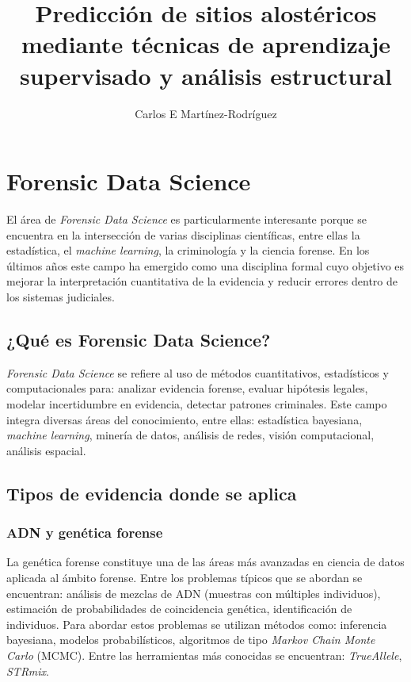 \documentclass[a4paper,10pt,oneside]{article}
\author{Carlos E Mart\'inez-Rodr\'iguez}
\date{}
\title{Predicci\'on de sitios alost\'ericos mediante t\'ecnicas de aprendizaje supervisado y an\'alisis estructural}
\begin{document}
\maketitle 
\tableofcontents
\section{Forensic Data Science}

El \'area de \textit{Forensic Data Science} es particularmente interesante porque se encuentra en la intersecci\'on de varias disciplinas cient\'ificas, entre ellas la estad\'istica, el \textit{machine learning}, la criminolog\'ia y la ciencia forense. En los \'ultimos a\~nos este campo ha emergido como una disciplina formal cuyo objetivo es mejorar la interpretaci\'on cuantitativa de la evidencia y reducir errores dentro de los sistemas judiciales.

\subsection{¿Qu\'e es Forensic Data Science?}

\textit{Forensic Data Science} se refiere al uso de m\'etodos cuantitativos, estad\'isticos y computacionales para: analizar evidencia forense, evaluar hip\'otesis legales, modelar incertidumbre en evidencia, detectar patrones criminales. Este campo integra diversas \'areas del conocimiento, entre ellas: estad\'istica bayesiana, \textit{machine learning}, miner\'ia de datos, an\'alisis de redes, visi\'on computacional, an\'alisis espacial.


\subsection{Tipos de evidencia donde se aplica}

\subsubsection*{ADN y gen\'etica forense}

La gen\'etica forense constituye una de las \'areas m\'as avanzadas en ciencia de datos aplicada al \'ambito forense. Entre los problemas t\'ipicos que se abordan se encuentran: an\'alisis de mezclas de ADN (muestras con m\'ultiples individuos), estimaci\'on de probabilidades de coincidencia gen\'etica, identificaci\'on de individuos. Para abordar estos problemas se utilizan m\'etodos como: inferencia bayesiana,  modelos probabil\'isticos, algoritmos de tipo \textit{Markov Chain Monte Carlo} (MCMC). Entre las herramientas m\'as conocidas se encuentran: \textit{TrueAllele}, \textit{STRmix}.
\end{document}
